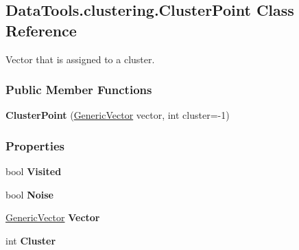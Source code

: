 \hypertarget{classDataTools_1_1clustering_1_1ClusterPoint}{}\subsection{Data\+Tools.\+clustering.\+Cluster\+Point Class Reference}
\label{classDataTools_1_1clustering_1_1ClusterPoint}


Vector that is assigned to a cluster.  


\subsubsection*{Public Member Functions}
\begin{DoxyCompactItemize}
\item 
\mbox{\label{classDataTools_1_1clustering_1_1ClusterPoint_a91d0a96b0abb918424888f1a90e4c689}} 
{\bfseries Cluster\+Point} (\hyperlink{classDataTools_1_1GenericVector}{Generic\+Vector} vector, int cluster=-\/1)
\end{DoxyCompactItemize}
\subsubsection*{Properties}
\begin{DoxyCompactItemize}
\item 
\mbox{\label{classDataTools_1_1clustering_1_1ClusterPoint_affa614e6cc6858af01de3e04a7e9453d}} 
bool {\bfseries Visited}
\item 
\mbox{\label{classDataTools_1_1clustering_1_1ClusterPoint_a6d6f1bc4e9f1aaacfdcb8f035c0b63a7}} 
bool {\bfseries Noise}
\item 
\mbox{\label{classDataTools_1_1clustering_1_1ClusterPoint_a6f46873bc5cd699e62445c1e51b67d3c}} 
\hyperlink{classDataTools_1_1GenericVector}{Generic\+Vector} {\bfseries Vector}
\item 
\mbox{\label{classDataTools_1_1clustering_1_1ClusterPoint_ae32ce03573ebee573a3cfd8d19648290}} 
int {\bfseries Cluster}
\end{DoxyCompactItemize}


